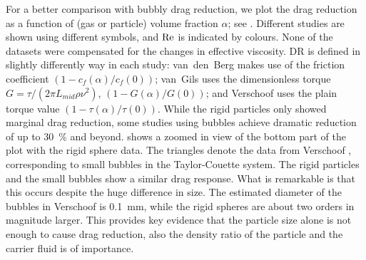 For a better comparison with bubbly drag reduction, we plot the drag reduction
as a function of (gas or particle) volume fraction $\alpha$; see 
. Different studies are shown using different symbols, and
$\text{Re}$ is indicated by colours. None of the datasets were compensated for the
changes in effective viscosity.   DR is defined in slightly differently
way in each study: van~den~Berg \citep{vandenBerg2005} makes use of the friction coefficient
$\left(1 - c_f(\alpha) /c_f(0) \right)$; van~Gils \citep{vanGils2013} uses the
dimensionless torque $G=\tau / (2 \pi L_{mid} \rho \nu^2)$, $\left(1 -
G(\alpha) / G(0) \right)$; and Verschoof \citep{Verschoof2016} uses the plain torque
value $\left(1 - \tau(\alpha) /\tau(0) \right)$. While the rigid particles
only showed marginal drag reduction, some studies using bubbles achieve
dramatic reduction of up to \SI{30}{\percent} and beyond. 
 shows a zoomed in view of the bottom part of the plot
with the rigid sphere data. The triangles denote the data from
Verschoof \citep{Verschoof2016}, corresponding to small bubbles in the Taylor-Couette
system. The rigid particles and the small bubbles show a similar drag
response. What is remarkable is that this occurs despite the huge difference
in size. The estimated diameter of the bubbles in Verschoof \citep{Verschoof2016} is
\SI{0.1}{\milli \metre}, while the rigid spheres are about two orders in
magnitude larger. This provides key evidence that the particle size alone is
not enough to cause drag reduction, also the density ratio of the
particle and the carrier fluid is of importance.


